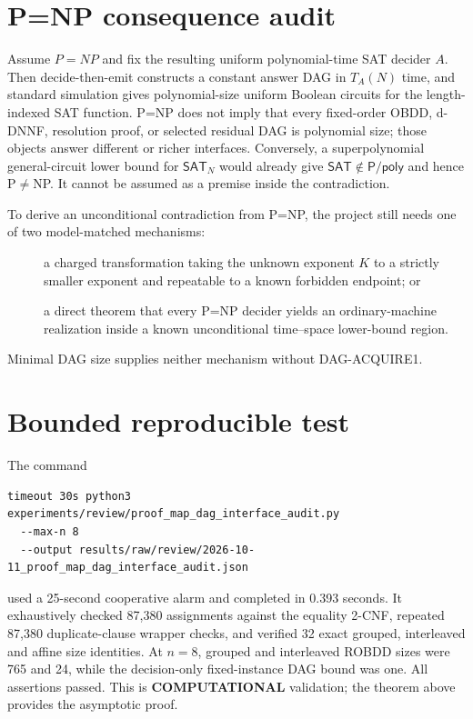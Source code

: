 \documentclass[11pt]{article}
\newcommand{\SAT}{\mathsf{SAT}}
\begin{document}
\section{P=NP consequence audit}
Assume $P=NP$ and fix the resulting uniform polynomial-time SAT decider $A$.
Then decide-then-emit constructs a constant answer DAG in $T_A(N)$ time, and
standard simulation gives polynomial-size uniform Boolean circuits for the
length-indexed SAT function.  P=NP does not imply that every fixed-order OBDD,
d-DNNF, resolution proof, or selected residual DAG is polynomial size; those
objects answer different or richer interfaces.  Conversely, a
superpolynomial general-circuit lower bound for $\SAT_N$ would already give
$\SAT\notin\mathsf{P/poly}$ and hence P$\ne$NP.  It cannot be assumed as a
premise inside the contradiction.

To derive an unconditional contradiction from P=NP, the project still needs
one of two model-matched mechanisms:
\begin{description}
\item[] a charged transformation taking the unknown exponent $K$ to a
strictly smaller exponent and repeatable to a known forbidden endpoint; or
\item[] a direct theorem that every P=NP decider yields an ordinary-machine
realization inside a known unconditional time--space lower-bound region.
\end{description}
Minimal DAG size supplies neither mechanism without \textsf{DAG-ACQUIRE1}.

\section{Bounded reproducible test}
The command
\begin{verbatim}
timeout 30s python3 experiments/review/proof_map_dag_interface_audit.py
  --max-n 8
  --output results/raw/review/2026-10-11_proof_map_dag_interface_audit.json
\end{verbatim}
used a 25-second cooperative alarm and completed in 0.393 seconds.  It
exhaustively checked 87,380 assignments against the equality 2-CNF, repeated
87,380 duplicate-clause wrapper checks, and verified 32 exact grouped,
interleaved and affine size identities.  At $n=8$, grouped and interleaved
ROBDD sizes were 765 and 24, while the decision-only fixed-instance DAG bound
was one.  All assertions passed.  This is \textbf{COMPUTATIONAL} validation;
the theorem above provides the asymptotic proof.
\end{document}
